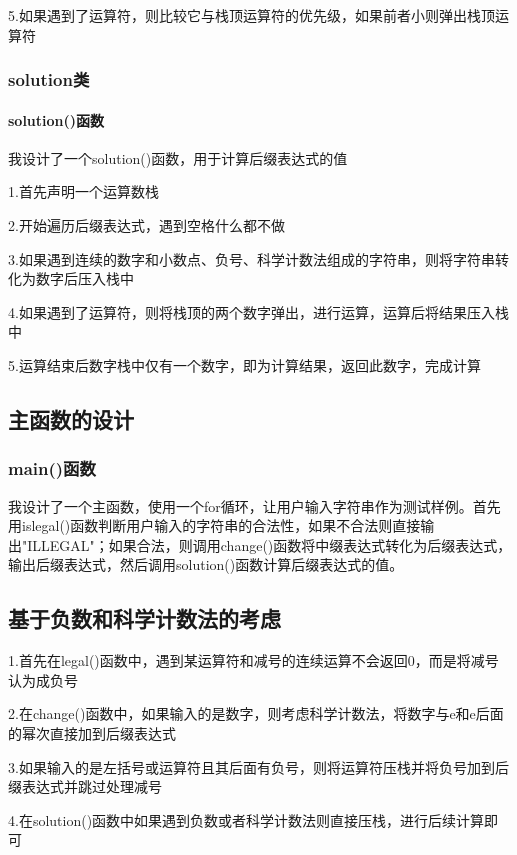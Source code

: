 \documentclass[UTF8]{ctexart}
\begin{document}
	5.如果遇到了运算符，则比较它与栈顶运算符的优先级，如果前者小则弹出栈顶运算符
	
	\subsubsection{solution类}

	\paragraph{solution()函数}
	
	我设计了一个solution()函数，用于计算后缀表达式的值
	
	1.首先声明一个运算数栈
	
	2.开始遍历后缀表达式，遇到空格什么都不做
	
	3.如果遇到连续的数字和小数点、负号、科学计数法组成的字符串，则将字符串转化为数字后压入栈中

	4.如果遇到了运算符，则将栈顶的两个数字弹出，进行运算，运算后将结果压入栈中
	
	5.运算结束后数字栈中仅有一个数字，即为计算结果，返回此数字，完成计算	
	\subsection{主函数的设计}
	
	\subsubsection{main()函数}
	
	我设计了一个主函数，使用一个for循环，让用户输入字符串作为测试样例。首先用islegal()函数判断用户输入的字符串的合法性，如果不合法则直接输出"ILLEGAL"；如果合法，则调用change()函数将中缀表达式转化为后缀表达式，输出后缀表达式，然后调用solution()函数计算后缀表达式的值。
	
	\subsection{基于负数和科学计数法的考虑}
	
	1.首先在legal()函数中，遇到某运算符和减号的连续运算不会返回0，而是将减号认为成负号
	
	2.在change()函数中，如果输入的是数字，则考虑科学计数法，将数字与e和e后面的幂次直接加到后缀表达式
	
	3.如果输入的是左括号或运算符且其后面有负号，则将运算符压栈并将负号加到后缀表达式并跳过处理减号
	
	4.在solution()函数中如果遇到负数或者科学计数法则直接压栈，进行后续计算即可
	
\end{document}
